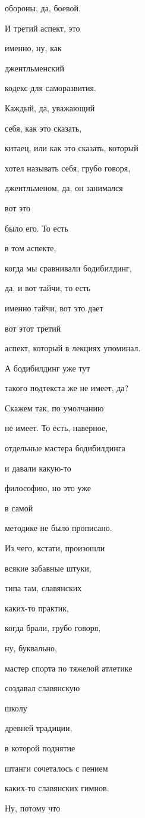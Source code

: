 обороны, да, боевой.

И третий аспект, это

именно, ну, как

джентльменский

кодекс для саморазвития.

Каждый, да, уважающий

себя, как это сказать,

китаец, или как это сказать, который

хотел называть себя, грубо говоря,

джентльменом, да, он занимался

вот это

было его. То есть

в том аспекте,

когда мы сравнивали бодибилдинг,

да, и вот тайчи, то есть

именно тайчи, вот это дает

вот этот третий

аспект, который в лекциях упоминал.

А бодибилдинг уже тут

такого подтекста же не имеет, да?

Скажем так, по умолчанию

не имеет. То есть, наверное,

отдельные мастера бодибилдинга

и давали какую-то

философию, но это уже

в самой

методике не было прописано.

Из чего, кстати, произошли

всякие забавные штуки,

типа там, славянских

каких-то практик,

когда брали, грубо говоря,

ну, буквально,

мастер спорта по тяжелой атлетике

создавал славянскую

школу

древней традиции,

в которой поднятие

штанги сочеталось с пением

каких-то славянских гимнов.

Ну, потому что

